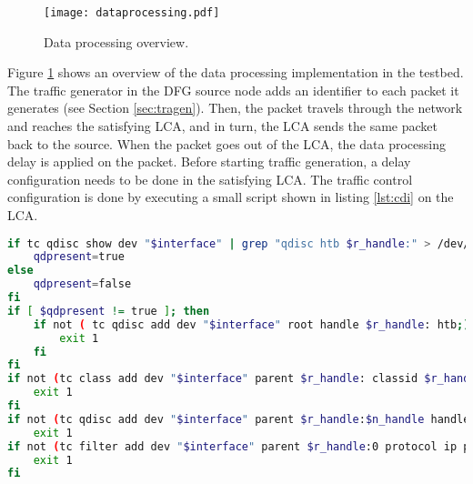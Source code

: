 \begin{figure}[H]
	\begin{center}
		\resizebox{\textwidth}{!}
		{\texttt{[image: dataprocessing.pdf]}}
		\caption{Data processing overview.}
		\label{fig:dataproc}
	\end{center}
\end{figure}

Figure \ref{fig:dataproc} shows an overview of the data processing implementation in the testbed. The traffic generator in the DFG source node adds an identifier to each packet it generates (see Section \ref{sec:tragen}). Then, the packet travels through the network and reaches the satisfying LCA, and in turn, the LCA sends the same packet back to the source. When the packet goes out of the LCA, the data processing delay is applied on the packet. Before starting traffic generation, a delay configuration needs to be done in the satisfying LCA. The traffic control configuration is done by executing a small script shown in listing \ref{lst:cdi} on the LCA.

\begin{lstlisting}[caption={Configure delay implementation},label={lst:cdi},language=bash,tabsize=2,basicstyle=\footnotesize,breaklines=true, showspaces=false,showstringspaces=false,showtabs=false,frame=single]
if tc qdisc show dev "$interface" | grep "qdisc htb $r_handle:" > /dev/null; then
	qdpresent=true
else
	qdpresent=false
fi
if [ $qdpresent != true ]; then
	if not ( tc qdisc add dev "$interface" root handle $r_handle: htb;) then
		exit 1
	fi
fi
if not (tc class add dev "$interface" parent $r_handle: classid $r_handle:$n_handle htb rate 2500Mbit;) then
	exit 1
fi
if not (tc qdisc add dev "$interface" parent $r_handle:$n_handle handle $n_handle: netem delay ${delay}ms;) then
	exit 1
if not (tc filter add dev "$interface" parent $r_handle:0 protocol ip prio 1 u32 classid 1:$n_handle match u32 $flowid 0xffffffff at 28;) then
	exit 1
fi
\end{lstlisting}

